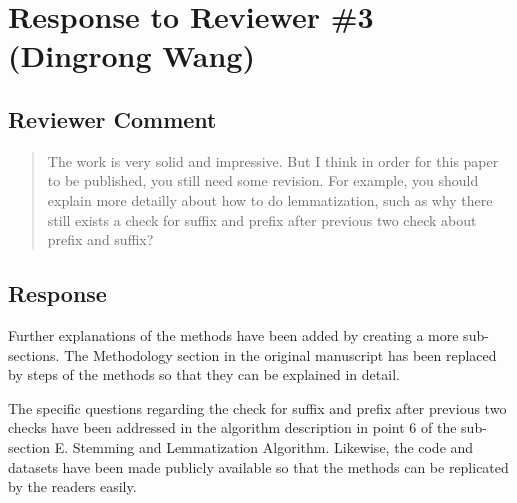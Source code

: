 \section{Response to Reviewer \#3 (Dingrong Wang)}



\subsection{Reviewer Comment}
\begin{mdframed}
\begin{quote}
The work is very solid and impressive. But I think in order for this paper to be
published, you still need some revision. For example, you should explain more
detailly about how to do lemmatization, such as why there still exists a check
for suffix and prefix after previous two check about prefix and suffix?
\end{quote}
\end{mdframed}

\subsection{Response} 
Further explanations of the methods have been added by creating a more
sub-sections. The Methodology section in the original manuscript has been
replaced by steps of the methods so that they can be explained in detail. 

The specific questions regarding the check for suffix and prefix after previous
two checks have been addressed in the algorithm description in point 6 of the 
sub-section E. Stemming and Lemmatization Algorithm. Likewise, the code 
and datasets have been made publicly available
so that the methods can
be replicated by the readers easily.\\

